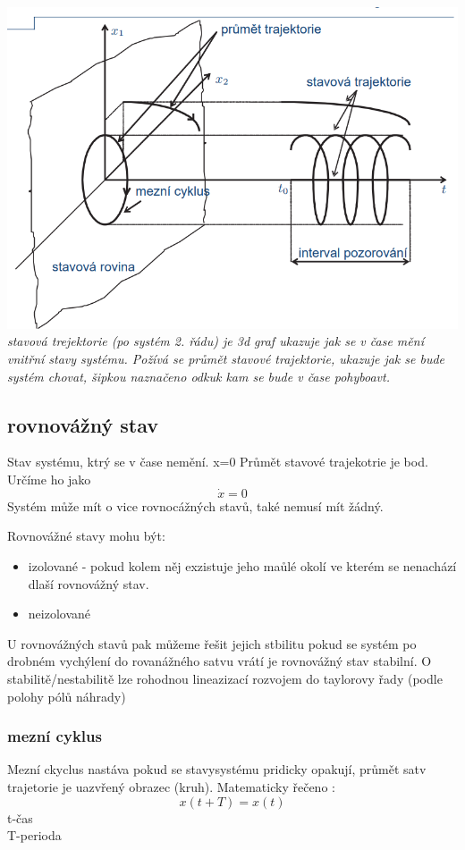 \includegraphics[scale = 0.8]{img/trajektorie.png}
{
\it stavová trejektorie (po systém 2. řádu) je 3d graf ukazuje jak se v čase mění vnitřní stavy systému.
Požívá se průmět stavové trajektorie, ukazuje jak se bude systém chovat, šipkou naznačeno odkuk kam se bude v čase pohyboavt.
}
\subsection{rovnovážný stav}
Stav systému, ktrý se v čase nemění. x=0 Průmět stavové trajekotrie je bod. Určíme
ho jako \[ \dot{x} = 0 \]
Systém může mít o vice rovnocážných stavů, také nemusí mít žádný.

Rovnovážné stavy mohu být:
\begin{itemize}
    \item izolované - pokud kolem něj exzistuje jeho maůlé okolí ve kterém se nenachází dlaší rovnovážný stav.
    \item neizolované
\end{itemize}

U rovnovážných stavů pak můžeme řešit jejich stbilitu pokud se systém po drobném vychýlení do rovanážného 
satvu vrátí je rovnovážný stav stabilní.
O stabilitě/nestabilitě lze rohodnou lineazizací rozvojem do taylorovy řady (podle polohy pólů náhrady)


\subsubsection{mezní cyklus}
Mezní ckyclus nastáva pokud se stavysystému pridicky opakují, průmět satv trajetorie je uazvřený obrazec (kruh).
Matematicky řečeno :
\[x(t+T)=x(t)\]
t-čas \\ T-perioda\\

